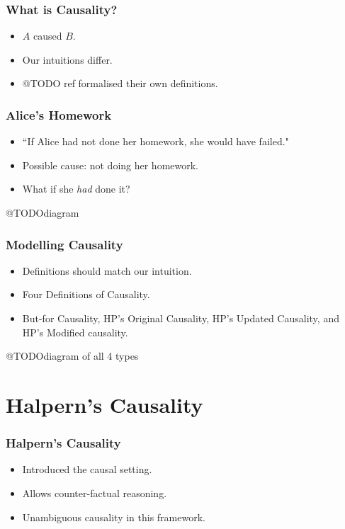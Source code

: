 \documentclass{beamer}
\theoremstyle{plain}
\theoremstyle{definition}
\begin{document}
 
\begin{frame}
\frametitle{What is Causality?}
\begin{itemize}
\item $A$ caused $B$.
\item Our intuitions differ.
\item @TODO ref formalised their own definitions.

\end{itemize}

\end{frame}

\begin{frame}
\frametitle{Alice's Homework}
\begin{itemize}
\item ``If Alice had not done her homework, she would have failed."
\item Possible cause: not doing her homework.
\item What if she \textit{had} done it?
\end{itemize}

@TODOdiagram

\end{frame}




\begin{frame}
\frametitle{Modelling Causality}
\begin{itemize}
\item Definitions should match our intuition.
\item Four Definitions of Causality.
\item But-for Causality, HP's Original Causality, HP's Updated Causality, and HP's Modified causality.
\end{itemize}

@TODOdiagram of all 4 types

\end{frame}



\section{Halpern's Causality}


\begin{frame}
\frametitle{Halpern's Causality}

\begin{itemize}
\item Introduced the causal setting.
\item Allows counter-factual reasoning.
\item Unambiguous causality in this framework.

\end{itemize}

\end{frame}
\end{document}
